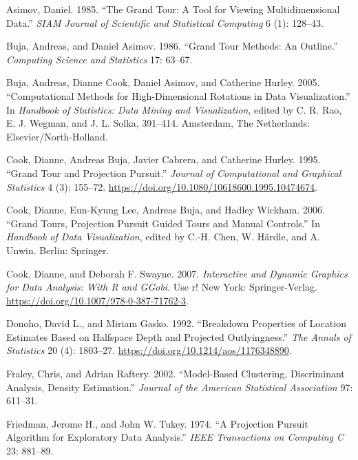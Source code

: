\documentclass[
  12pt,
]{interact}
\newlength{\cslhangindent}
\newenvironment{CSLReferences}[2] %
 {\begin{list}{}{%
  \setlength{\itemindent}{0pt}
  \setlength{\leftmargin}{0pt}
  \setlength{\parsep}{0pt}
  \ifodd #1
   \setlength{\leftmargin}{\cslhangindent}
   \setlength{\itemindent}{-1\cslhangindent}
  \fi
  \setlength{\itemsep}{#2\baselineskip}}}
 {\end{list}}
\begin{document}
\label{refs}
\begin{CSLReferences}{1}{0}
Asimov, Daniel. 1985. {``{T}he {G}rand {T}our: {A} {T}ool for {V}iewing
{M}ultidimensional {D}ata.''} \emph{SIAM Journal of Scientific and
Statistical Computing} 6 (1): 128--43.

Buja, Andreas, and Daniel Asimov. 1986. {``{G}rand {T}our {M}ethods:
{A}n {O}utline.''} \emph{Computing Science and Statistics} 17: 63--67.

Buja, Andreas, Dianne Cook, Daniel Asimov, and Catherine Hurley. 2005.
{``{C}omputational {M}ethods for {H}igh-{D}imensional {R}otations in
{D}ata {V}isualization.''} In \emph{Handbook of Statistics: Data Mining
and Visualization}, edited by C. R. Rao, E. J. Wegman, and J. L. Solka,
391--414. Amsterdam, The Netherlands: Elsevier/North-Holland.

Cook, Dianne, Andreas Buja, Javier Cabrera, and Catherine Hurley. 1995.
{``Grand Tour and Projection Pursuit.''} \emph{Journal of Computational
and Graphical Statistics} 4 (3): 155--72.
\url{https://doi.org/10.1080/10618600.1995.10474674}.

Cook, Dianne, Eun-Kyung Lee, Andreas Buja, and Hadley Wickham. 2006.
{``{G}rand {T}ours, {P}rojection {P}ursuit {G}uided {T}ours and {M}anual
{C}ontrols.''} In \emph{Handbook of {D}ata {V}isualization}, edited by
C.-H. Chen, W. Härdle, and A. Unwin. Berlin: Springer.

Cook, Dianne, and Deborah F. Swayne. 2007. \emph{Interactive and Dynamic
Graphics for Data Analysis: With {R} and {GGobi}}. Use r! New York:
Springer-Verlag. \url{https://doi.org/10.1007/978-0-387-71762-3}.

Donoho, David L., and Miriam Gasko. 1992. {``{Breakdown Properties of
Location Estimates Based on Halfspace Depth and Projected
Outlyingness}.''} \emph{The Annals of Statistics} 20 (4): 1803--27.
\url{https://doi.org/10.1214/aos/1176348890}.

Fraley, Chris, and Adrian Raftery. 2002. {``Model-Based {C}lustering,
{D}iscriminant {A}nalysis, {D}ensity {E}stimation.''} \emph{Journal of
the American Statistical Association} 97: 611--31.

Friedman, Jerome H., and John W. Tukey. 1974. {``{A} {P}rojection
{P}ursuit {A}lgorithm for {E}xploratory {D}ata {A}nalysis.''} \emph{IEEE
Transactions on Computing C} 23: 881--89.


\end{CSLReferences}
\end{document}
